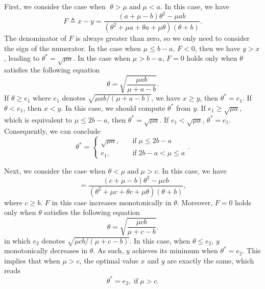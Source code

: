 \documentclass[letterpaper]{article} %
\begin{document}
First, we consider the case when $\;\theta>\mu\; \text{and}\;  \mu<a$. In this case, we have
\begin{equation*}
F \triangleq x-y =\frac{\left(a + \mu - b\right)\theta^2 - \mu ab}{(\theta^2+\mu a+\theta a+\mu\theta)(\theta+b)}.
\end{equation*}
The denominator of $F$ is always greater than zero, so we only need to consider the sign of the numerator. In the case when $\mu\leq b-a$, $F <0 $, then we have $y > x$, leading to $\theta^*=\sqrt{\mu a}$. In the case when $\mu> b-a$, $F = 0$ holds only when $\theta$ satisfies the following equation
\begin{equation*}
\theta = \sqrt{\frac{\mu a b}{\mu+a-b}}.
\end{equation*}
If $\theta\geq e_1$ where $e_1$ denotes $\sqrt{\mu a b/(\mu+a-b)}$, we have $x\geq y$, then $\theta^*=e_1$. If $\theta < e_1$, then $x < y$. In this case, we should compute $\theta^*$ from $y$. If $e_1\geq \sqrt{\mu a}$, which is equivalent to $\mu\leq 2b-a$, then $\theta^*=\sqrt{\mu a}$. If $e_1 < \sqrt{\mu a}$, $\theta^* = e_1$. Consequently, we can conclude
  \begin{equation}\label{theta1}
	\theta^*=
	\begin{cases}
            \sqrt{\mu a},\quad & \text{if}\;\mu\leq 2b-a  \\
		e_1,\quad & \text{if}\;2b-a<\mu\leq a
	\end{cases}.
\end{equation}

Next, we consider the case when $\theta<\mu\; \text{and} \;\mu>c  $. In this case, we have
\begin{equation*}
 =\frac{\left(c + \mu - b\right)\theta^2 - \mu cb}{(\theta^2+\mu c+\theta c+\mu\theta)(\theta+b)},
  \end{equation*}
where $c \geqslant b $. $F$ in this case increases monotonically in $\theta$. Moreover, $F=0$ holds only when $\theta$ satisfies the following equation
 \begin{equation*}
 	\theta = \sqrt{\frac{\mu c b}{\mu+c-b}}.
 \end{equation*}
 in which $e_2$ denotes $\sqrt{\mu cb/(\mu+c-b)}$. In this case, when $\theta \leq e_2$, $y$ monotonically decreases in $\theta$. As such, $y$ achieves its minimum when $\theta^*=e_2$. This implies that when $\mu> c$, the optimal value $x$ and $y$ are exactly the same, which reads
\begin{equation}\label{theta2}
\theta^* =e_2,\;\text{if} \;\mu>c.
\end{equation}
\end{document}
